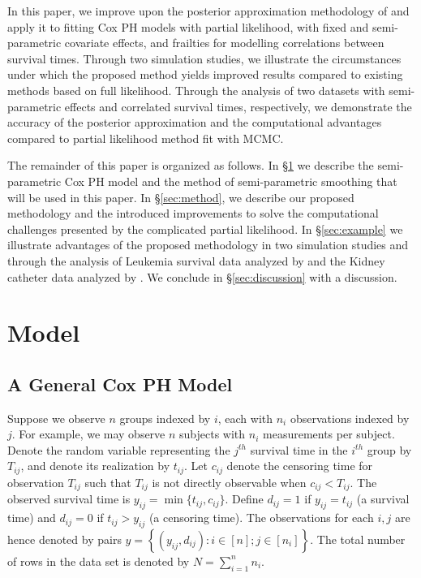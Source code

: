 \documentclass[ba]{imsart}
\begin{document}
In this paper, we improve upon the posterior approximation methodology of \cite{casecross} and apply it to fitting Cox PH models with partial likelihood, with fixed and semi-parametric covariate effects, and frailties for modelling correlations between survival times. Through two simulation studies, we illustrate the circumstances under which the proposed method yields improved results compared to existing methods based on full likelihood. Through the analysis of two datasets with semi-parametric effects and correlated survival times, respectively, we demonstrate the accuracy of the posterior approximation and the computational advantages compared to partial likelihood method fit with MCMC.


The remainder of this paper is organized as follows. In \S\ref{sec:model} we describe the semi-parametric Cox PH model and the method of semi-parametric smoothing that will be used in this paper. In \S\ref{sec:method}, we describe our proposed methodology and the introduced improvements to solve the computational challenges presented by the complicated partial likelihood. In \S\ref{sec:example} we illustrate advantages of the proposed methodology in two simulation studies and through the analysis of Leukemia survival data analyzed by \cite{inlacoxph} and the Kidney catheter data analyzed by \cite{kidney}. We conclude in \S\ref{sec:discussion} with a discussion.

\section{Model}\label{sec:model}

\subsection{A General Cox PH Model}

Suppose we observe $n$ groups indexed by $i$, each with $n_{i}$ observations indexed by $j$. For example, we may observe $n$ subjects with $n_{i}$ measurements per subject. Denote the random variable representing the $j^{th}$ survival time in the $i^{th}$ group by $T_{ij}$, and denote its realization by $t_{ij}$. Let $c_{ij}$ denote the censoring time for observation $T_{ij}$ such that $T_{ij}$ is not directly observable when $c_{ij} < T_{ij}$. The observed survival time is $y_{ij} = \min\{t_{ij},c_{ij}\}$. Define $d_{ij} = 1$ if $y_{ij} = t_{ij}$ (a survival time) and $d_{ij} = 0$ if $t_{ij} > y_{ij}$ (a censoring time). The observations for each $i,j$ are hence denoted by pairs $y =  \left\{(y_{ij},d_{ij}): i\in[n]; j\in[n_{i}] \right\}$. The total number of rows in the data set is denoted by $N = \sum_{i=1}^{n}n_{i}$.
\end{document}
